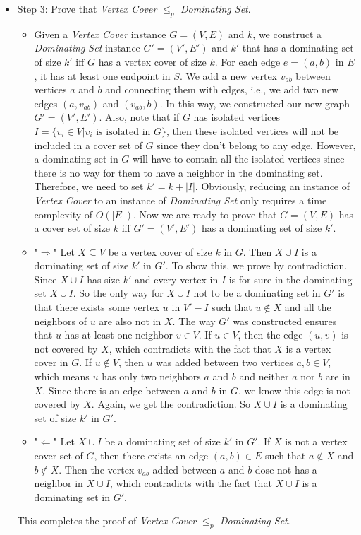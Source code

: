 \documentclass{article}
\begin{document}
\begin{tcolorbox}
\begin{itemize}
\item Step 3: Prove that  {\em Vertex Cover}  $ \leq_{p}$ {\em Dominating Set}.
\begin{itemize}
\item Given a {\em Vertex Cover} instance  $G = (V, E)$ and $k$, we construct a {\em Dominating Set} instance $G' = (V', E')$ and $k'$ that has a dominating set of size $k'$ iff $G$ has a vertex cover of size $k$. For each edge $e = (a,b)$ in $E$, it has at least one endpoint in $S$. We add a new vertex $v_{ab}$ between vertices $a$ and $b$ and connecting them with edges, i.e., we add two new edges $(a, v_{ab})$ and $(v_{ab}, b)$. In this way, we constructed our new graph $G' = (V', E')$. Also, note that if $G$ has isolated vertices $I = \{ v_i \in V | v_i \text{ is isolated in } G\}$, then these isolated vertices will not be included in a cover set of $G$ since they don't belong to any edge. However, a dominating set in $G$ will have to contain all the isolated vertices since there is no way for them to have a neighbor in the dominating set. Therefore, we need to set $k' = k + |I|$. Obviously, reducing an instance of {\em Vertex Cover} to an instance of {\em Dominating Set} only requires a time complexity of $O(|E|)$. Now we are ready to prove that $G = (V, E)$ has a cover set of size $k$ iff $G' = (V', E')$ has a dominating set of size $k'$.

\item "$\Rightarrow$" Let $X \subseteq V$ be a vertex cover of size $k$ in $G$. Then  $X \cup I $ is a dominating set of size $k'$ in $G'$. To show this, we prove by contradiction. Since $X \cup I $ has size $k'$ and every vertex in $I$ is for sure in the dominating set $X \cup I$. So the only way for $X \cup I $ not to be a dominating set in $G'$ is that there exists some vertex $u$ in $V' - I$ such that $u \notin X$ and all the neighbors of $u$ are also not in $X$. The way $G'$ was constructed ensures that $u$ has at least one neighbor $v \in V$. If  $u \in V$, then the edge $(u, v)$ is not covered by $X$, which contradicts with the fact that $X$ is a vertex cover in $G$. If $u \notin V$, then $u$ was added between two vertices $a, b \in V$, which means $u$ has only two neighbors $a$ and $b$ and neither $a$ nor $b$ are in $X$. Since there is an edge between $a$ and $b$ in $G$, we know this edge is not covered by $X$. Again, we get the contradiction. So $X \cup I $ is a dominating set of size $k'$ in $G'$. 

\item "$\Leftarrow$" Let  $X \cup I $ be a dominating set of size $k'$ in $G'$. If $X$ is not a vertex cover set of $G$, then there exists an edge $(a,b) \in E$ such that $a \notin X$ and $b \notin X$. Then the vertex $v_{ab}$ added between $a$ and $b$ dose not has a neighbor in $X \cup I$, which contradicts with the fact that $X \cup I$ is a dominating set in $G'$.
\end{itemize}
This completes the proof of {\em Vertex Cover}  $ \leq_{p}$ {\em Dominating Set}.
\end{itemize}
\end{tcolorbox}
\end{document}

